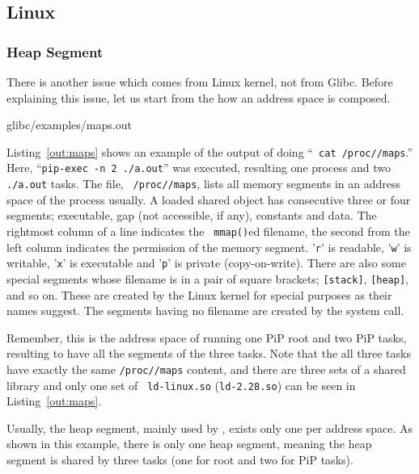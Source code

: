 \subsection{Linux}

\subsubsection{Heap Segment}\label{sec:heap}

There is another issue which comes from Linux kernel, not from
Glibc. Before explaining this issue, let us start from the how an
address space is composed. 

 {glibc/examples/maps.out}

Listing~\ref{out:maps} shows an example of the output of doing ``{\tt
  cat /proc//maps}.'' Here, ``{\tt pip-exec -n 2
  ./a.out}'' was executed, resulting one  process
and two {\tt ./a.out} tasks. The file, {\tt
  /proc//maps}, lists all memory
segments in an address space of the process 
usually. A loaded shared object has consecutive three or four segments; 
executable, gap (not accessible, if any), constants and data. 
The rightmost column of a line indicates the {\tt
  mmap()}ed filename, the second from the left column indicates the
permission of the memory segment. '{\tt r}' is readable, '{\tt w}' is
writable, '{\tt x}' is executable and '{\tt p}' is private
(copy-on-write). There are also some special segments whose filename
is in a pair of square brackets; {\tt [stack]}, {\tt [heap]}, and so
on. These are created by the Linux kernel for special purposes as
their names suggest. The segments having no filename are created by
the  system call. 

Remember, this is the address space of running one PiP root and two PiP
tasks, resulting to have all the segments of the three tasks.
Note that the all three tasks have
exactly the same {\tt /proc//maps} content, and
there are three sets of a shared library and only one set of {\tt
  ld-linux.so} ({\tt ld-2.28.so}) can be seen in
Listing~\ref{out:maps}.

Usually, the heap segment, mainly used by , exists only
one per address space. As shown in this example, there is only one heap
segment, meaning the heap segment is shared by three tasks (one for
root and two for PiP tasks). 


